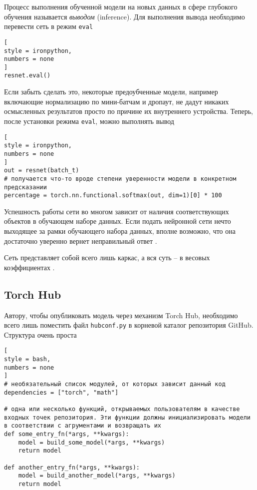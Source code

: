 \documentclass[%
	11pt,
	a4paper,
	utf8,
		]{article}
\begin{document}
Процесс выполнения обученной модели на новых данных в сфере глубокого обучения называется \emph{выводом} (inference). Для выполнения вывода необходимо перевести сеть в режим \verb|eval|
\begin{lstlisting}[
style = ironpython,
numbers = none
]
resnet.eval()
\end{lstlisting}

Если забыть сделать это, некоторые предоубченные модели, например включающие нормализацию по мини-батчам и дропаут, не дадут никаких осмысленных результатов просто по причине их внутреннего устройства. Теперь, после установки режима \verb|eval|, можно выполнять вывод
\begin{lstlisting}[
style = ironpython,
numbers = none
]
out = resnet(batch_t)
# получается что-то вроде степени уверенности модели в конкретном предсказании
percentage = torch.nn.functional.softmax(out, dim=1)[0] * 100
\end{lstlisting}

Успешность работы сети во многом зависит от наличия соответствующих объектов в обучающем наборе данных. Если подать нейронной сети нечто выходящее за рамки обучающего набора данных, вполне возможно, что она достаточно уверенно вернет неправильный ответ \cite[]{pytorch-2022}.

Сеть представляет собой всего лишь каркас, а вся суть -- в весовых коэффициентах \cite[]{pytorch-2022}.

\subsection{Torch Hub}

Автору, чтобы опубликовать модель через механизм Torch Hub, необходимо всего лишь поместить файл \verb|hubconf.py| в корневой каталог репозитория GitHub. Структура очень проста
\begin{lstlisting}[
style = bash,
numbers = none
]
# необязательный список модулей, от которых зависит данный код
dependencies = ["torch", "math"]

# одна или несколько функций, открываемых пользователям в качестве входных точек репозитория. Эти функции должны инициализировать модели в соответствии с агрументами и возвращать их
def some_entry_fn(*args, **kwargs):
    model = build_some_model(*args, **kwargs)
    return model
    
def another_entry_fn(*args, **kwargs):
    model = build_another_model(*args, **kwargs)
    return model
\end{lstlisting}
\end{document}
